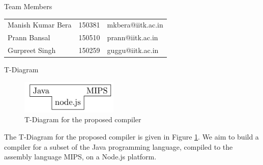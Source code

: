 \documentclass[landscape, 11pt]{article}
\begin{document}
\makeheader

\begin{qsection}{Team Members} \vspace{5mm}

	\begin{center}
		\begin{tabular}[h!]{lC{3.5cm}l}
			\hline
						&		&	 			\\
			\hline
			Manish Kumar Bera	&	150381				&	mkbera@iitk.ac.in	\\
			Prann Bansal		&	150510				&	prann@iitk.ac.in	\\
			Gurpreet Singh		&	150259				&	guggu@iitk.ac.in	\\
			\hline
		\end{tabular}
	\end{center}

\end{qsection}

\begin{qsection}{T-Diagram}

	\begin{figure}[h!]
		\centering
		\includegraphics[height=60px]{includes/t-diagram.pdf}
		\caption{T-Diagram for the proposed compiler}
		\label{fig:t-diagram}
	\end{figure}

	The T-Diagram for the proposed compiler is given in Figure \ref{fig:t-diagram}. We aim to build a compiler for a subset of the Java programming language, compiled to the assembly language MIPS, on a Node.js platform.

\end{qsection}
\end{document}
